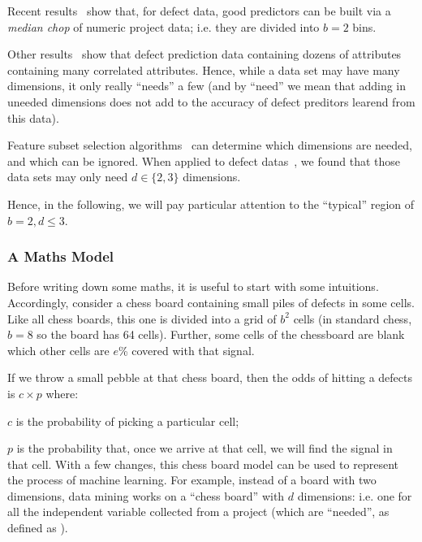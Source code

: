 Recent
results~\cite{Zhang2014,nam2015clami} show that, for defect data, good
predictors can be built via a {\em median chop} of
numeric project data;
i.e. they are divided into $b=2$ bins.

Other results~\cite{shepperd94}
show that defect prediction data containing dozens
of attributes  containing many correlated
attributes. Hence, while a data set may have many dimensions, it only really ``needs'' a few
(and by ``need'' we mean that adding in uneeded dimensions does not add to the accuracy
of defect preditors learend from this data).


Feature subset selection algorithms~\cite{Hall03} can  determine
which  dimensions are needed, and which can be ignored.
When applied to defect datas~\cite{Menzies07},
we found that those data sets may only need  $d \in \{2,3\}$
dimensions.

Hence, in the following, we will pay particular attention to the ``typical'' region of
 $b=2, d \le 3$.

\subsubsection{A Maths Model}

Before writing down some maths, it is useful to start with some intuitions.
Accordingly, consider a chess board  containing small  piles of defects in some cells.
Like all chess boards, this one is  divided into a grid of $b^2$ cells (in standard chess, $b=8$ so the board has 64 cells).
Further, some cells of the chessboard are blank which other cells are $e$\% covered
with that signal.

If we throw a small pebble at that chess board, then  the odds
of hitting a defects is $c \times p$ where:
\bi
\item $c$ is the probability of picking a particular cell;
\item $p$ is the probability that, once we arrive at that cell, we will find  the  signal in that cell.
\ei
With a few changes, this chess board model can be
used to represent the process of machine
learning. For example,
instead of a board with two
dimensions, data mining works on a ``chess board''
with $d$ dimensions: i.e. one for all the independent
variable collected from a project (which are ``needed'', as defined as ).

